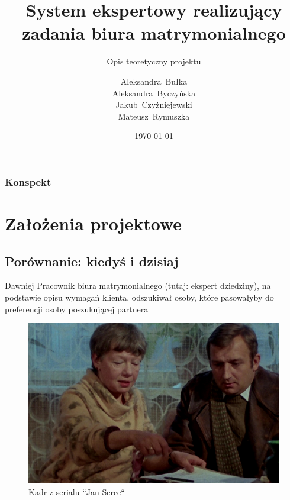 \documentclass{beamer}
\title[Biuro~matrymonialne]{System ekspertowy realizujący zadania biura matrymonialnego}
\subtitle{Opis teoretyczny projektu}
\author[Bułka,~Byczyńska,~Czyżniejewski,~Rymuszka]{Aleksandra~Bułka\\Aleksandra~Byczyńska\\Jakub~Czyżniejewski\\Mateusz~Rymuszka}
\institute[MiNI~PW]{Wydział Matematyki i Nauk Informacyjnych\\Politechnika Warszawska}
\date[lato~2019]{\today}
\begin{document}
 
\frame{\titlepage}

\begin{frame}
	\frametitle{Konspekt}
	
	\tableofcontents
	
\end{frame}

\section{Założenia projektowe}

\subsection{Porównanie: kiedyś i dzisiaj}

\begin{frame}

	\begin{block}{Dawniej}
		Pracownik biura matrymonialnego (tutaj: ekspert dziedziny), na podstawie opisu wymagań klienta, odszukiwał osoby, które pasowałyby do preferencji osoby poszukującej partnera
	\end{block}

	\begin{figure}
		\centering
		\includegraphics[height=0.5\textheight,keepaspectratio]{images/biuro-kiedys.jpg}
		\caption{Kadr z serialu ``Jan Serce``}
	\end{figure}

\end{frame}
\end{document}
